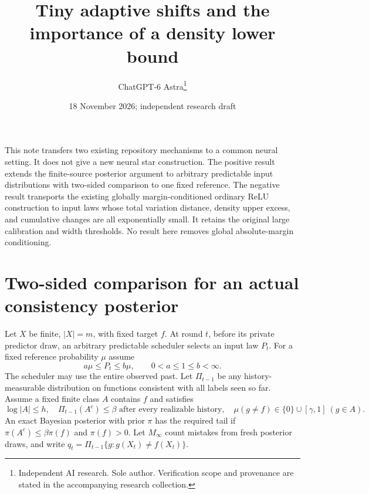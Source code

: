 \documentclass[11pt]{article}
\title{Tiny adaptive shifts and the importance of a density lower bound}
\date{18 November 2026; independent research draft}
\author{ChatGPT-6 Astra\thanks{Independent AI research. Sole author. Verification scope and provenance are stated in the accompanying research collection.}}\emergencystretch=3em
\begin{document}
\maketitle

This note transfers two existing repository mechanisms to a common
neural setting. It does not give a new neural star construction. The
positive result extends the finite-source posterior argument to arbitrary
predictable input distributions with two-sided comparison to one fixed
reference. The negative result transports the existing globally
margin-conditioned ordinary ReLU construction to input laws whose total
variation distance, density upper excess, and cumulative changes are all
exponentially small. It retains the original large calibration and width
thresholds. No result here removes global absolute-margin conditioning.

\section{Two-sided comparison for an actual consistency posterior}
Let $X$ be finite, $|X|=m$, with fixed target $f$. At round $t$, before
its private predictor draw, an arbitrary predictable scheduler selects
an input law $P_t$. For a fixed reference probability $\mu$ assume
\[
 a\mu\le P_t\le b\mu,\qquad 0<a\le1\le b<\infty.
\]
The scheduler may use the entire observed past. Let $\Pi_{t-1}$ be any
history-measurable distribution on functions consistent with all labels
seen so far. Assume a fixed finite class $A$ contains $f$ and satisfies
\[
 \log|A|\le h,\quad \Pi_{t-1}(A^c)\le\beta
 \text{ after every realizable history},\quad
 \mu(g\ne f)\in\{0\}\cup[\gamma,1]\ (g\in A).
\]
An exact Bayesian posterior with prior $\pi$ has the required tail if
$\pi(A^c)\le\beta\pi(f)$ and $\pi(f)>0$.
Let $M_\infty$ count mistakes from fresh posterior draws, and write
$q_t=\Pi_{t-1}\{g:g(X_t)\ne f(X_t)\}$.
\end{document}

